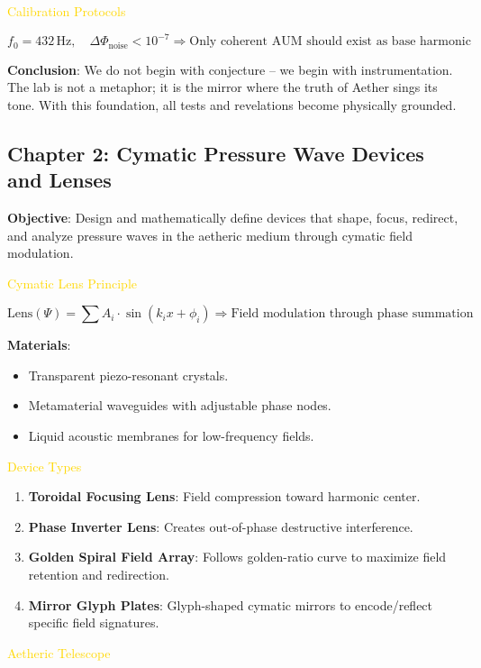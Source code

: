 \textcolor{gold}{ Calibration Protocols }

\[
f_0 = 432 \, \text{Hz}, \quad \Delta \Phi_{\text{noise}} < 10^{-7} \Rightarrow \text{Only coherent AUM should exist as base harmonic}
\]

\textbf{Conclusion}: We do not begin with conjecture -- we begin with instrumentation. The lab is not a metaphor; it is the mirror where the truth of Aether sings its tone. With this foundation, all tests and revelations become physically grounded.

\subsection{Chapter 2: Cymatic Pressure Wave Devices and Lenses}

\textbf{Objective}: Design and mathematically define devices that shape, focus, redirect, and analyze pressure waves in the aetheric medium through cymatic field modulation.

\textcolor{gold}{ Cymatic Lens Principle }

\[
\text{Lens}(\Psi) = \sum A_i \cdot \sin \left( k_i x + \phi_i \right) \Rightarrow \text{Field modulation through phase summation}
\]

\textbf{Materials}:
\begin{itemize}
    \item Transparent piezo-resonant crystals.
    \item Metamaterial waveguides with adjustable phase nodes.
    \item Liquid acoustic membranes for low-frequency fields.
\end{itemize}

\textcolor{gold}{ Device Types }
\begin{enumerate}
    \item \textbf{Toroidal Focusing Lens}: Field compression toward harmonic center.
    \item \textbf{Phase Inverter Lens}: Creates out-of-phase destructive interference.
    \item \textbf{Golden Spiral Field Array}: Follows golden-ratio curve to maximize field retention and redirection.
    \item \textbf{Mirror Glyph Plates}: Glyph-shaped cymatic mirrors to encode/reflect specific field signatures.
\end{enumerate}

\textcolor{gold}{ Aetheric Telescope }

